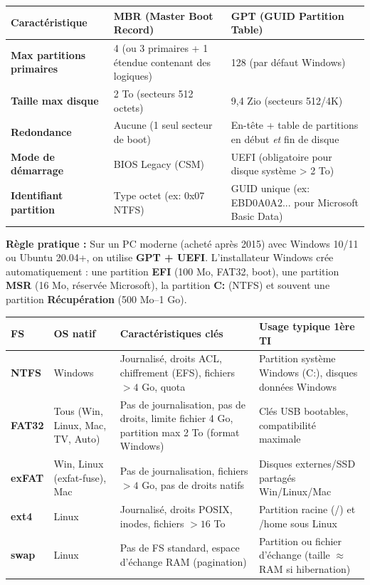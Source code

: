 \documentclass[11pt]{article}
\begin{document}
\begin{propriete}
\begin{center}
\begin{tabularx}{\linewidth}{|l|X|X|}\hline
\rowcolor{popblueL} \textbf{Caractéristique} & \textbf{MBR (Master Boot Record)} & \textbf{GPT (GUID Partition Table)} \\\hline
\textbf{Max partitions primaires} & 4 (ou 3 primaires + 1 étendue contenant des logiques) & 128 (par défaut Windows) \\\hline
\textbf{Taille max disque} & 2 To (secteurs 512 octets) & 9,4 Zio (secteurs 512/4K) \\\hline
\textbf{Redondance} & Aucune (1 seul secteur de boot) & En-tête + table de partitions en début \emph{et} fin de disque \\\hline
\textbf{Mode de démarrage} & BIOS Legacy (CSM) & UEFI (obligatoire pour disque système > 2 To) \\\hline
\textbf{Identifiant partition} & Type octet (ex: 0x07 NTFS) & GUID unique (ex: EBD0A0A2... pour Microsoft Basic Data) \\\hline
\end{tabularx}
\end{center}
\textbf{Règle pratique :} Sur un PC moderne (acheté après 2015) avec Windows 10/11 ou Ubuntu 20.04+, on utilise \textbf{GPT + UEFI}. L'installateur Windows crée automatiquement : une partition \textbf{EFI} (100 Mo, FAT32, boot), une partition \textbf{MSR} (16 Mo, réservée Microsoft), la partition \textbf{C:} (NTFS) et souvent une partition \textbf{Récupération} (500 Mo--1 Go).
\end{propriete}

\begin{propriete}
\begin{center}
\begin{tabularx}{\linewidth}{|l|l|X|X|}\hline
\rowcolor{popblueL} \textbf{FS} & \textbf{OS natif} & \textbf{Caractéristiques clés} & \textbf{Usage typique 1ère TI} \\\hline
\textbf{NTFS} & Windows & Journalisé, droits ACL, chiffrement (EFS), fichiers $> 4$ Go, quota & Partition système Windows (C:), disques données Windows \\\hline
\textbf{FAT32} & Tous (Win, Linux, Mac, TV, Auto) & Pas de journalisation, pas de droits, limite fichier 4 Go, partition max 2 To (format Windows) & Clés USB bootables, compatibilité maximale \\\hline
\textbf{exFAT} & Win, Linux (exfat-fuse), Mac & Pas de journalisation, fichiers $> 4$ Go, pas de droits natifs & Disques externes/SSD partagés Win/Linux/Mac \\\hline
\textbf{ext4} & Linux & Journalisé, droits POSIX, inodes, fichiers $> 16$ To & Partition racine (/) et /home sous Linux \\\hline
\textbf{swap} & Linux & Pas de FS standard, espace d'échange RAM (pagination) & Partition ou fichier d'échange (taille $\approx$ RAM si hibernation) \\\hline
\end{tabularx}
\end{center}
\end{propriete}
\end{document}
